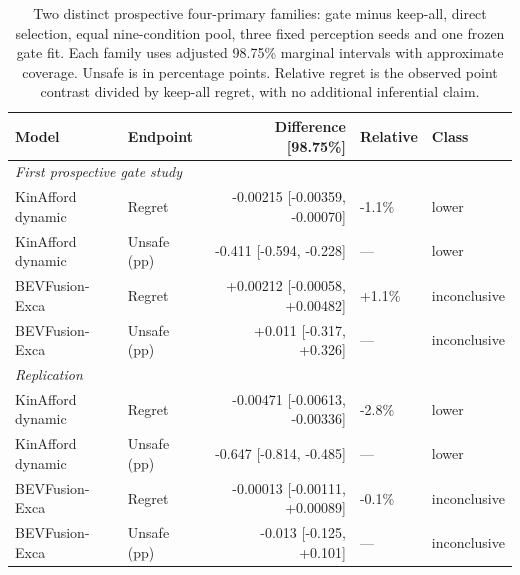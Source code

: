 \begin{table}[H]\centering\footnotesize\setlength{\tabcolsep}{3pt}
\caption{Two distinct prospective four-primary families: gate minus keep-all, direct selection, equal nine-condition pool, three fixed perception seeds and one frozen gate fit. Each family uses adjusted 98.75\% marginal intervals with approximate coverage. Unsafe is in percentage points. Relative regret is the observed point contrast divided by keep-all regret, with no additional inferential claim.}\label{tab:gateprimarycombined}
\begin{tabular}{llrll}\toprule Model & Endpoint & Difference [98.75\%] & Relative & Class\\\midrule
\multicolumn{5}{l}{\textit{First prospective gate study}}\\
KinAfford dynamic & Regret & -0.00215 [-0.00359, -0.00070] & -1.1\% & lower\\
KinAfford dynamic & Unsafe (pp) & -0.411 [-0.594, -0.228] & --- & lower\\
BEVFusion-Exca & Regret & +0.00212 [-0.00058, +0.00482] & +1.1\% & inconclusive\\
BEVFusion-Exca & Unsafe (pp) & +0.011 [-0.317, +0.326] & --- & inconclusive\\
\multicolumn{5}{l}{\textit{Replication}}\\
KinAfford dynamic & Regret & -0.00471 [-0.00613, -0.00336] & -2.8\% & lower\\
KinAfford dynamic & Unsafe (pp) & -0.647 [-0.814, -0.485] & --- & lower\\
BEVFusion-Exca & Regret & -0.00013 [-0.00111, +0.00089] & -0.1\% & inconclusive\\
BEVFusion-Exca & Unsafe (pp) & -0.013 [-0.125, +0.101] & --- & inconclusive\\
\bottomrule\end{tabular}\end{table}
